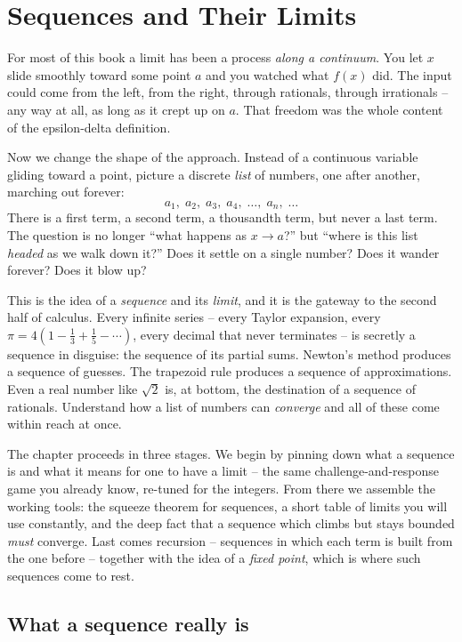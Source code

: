 \chapter{Sequences and Their Limits}

For most of this book a limit has been a process \emph{along a continuum}. You
let $x$ slide smoothly toward some point $a$ and you watched what $f(x)$ did. The
input could come from the left, from the right, through rationals, through
irrationals -- any way at all, as long as it crept up on $a$. That freedom was
the whole content of the epsilon-delta definition.

Now we change the shape of the approach. Instead of a continuous variable
gliding toward a point, picture a discrete \emph{list} of numbers, one after
another, marching out forever:
\[
  a_1,\; a_2,\; a_3,\; a_4,\; \dots,\; a_n,\; \dots
\]
There is a first term, a second term, a thousandth term, but never a last term.
The question is no longer ``what happens as $x \to a$?'' but ``where is this list
\emph{headed} as we walk down it?'' Does it settle on a single number? Does it
wander forever? Does it blow up?

This is the idea of a \emph{sequence} and its \emph{limit}, and it is the gateway
to the second half of calculus. Every infinite series -- every Taylor expansion,
every $\pi = 4(1 - \tfrac13 + \tfrac15 - \cdots)$, every decimal that never
terminates -- is secretly a sequence in disguise: the sequence of its partial
sums. Newton's method produces a sequence of guesses. The trapezoid rule
produces a sequence of approximations. Even a real number like $\sqrt{2}$ is, at
bottom, the destination of a sequence of rationals. Understand how a list
of numbers can \emph{converge} and all of these come within reach at once.

The chapter proceeds in three stages. We begin by pinning down what a sequence is
and what it means for one to have a limit -- the same challenge-and-response game
you already know, re-tuned for the integers. From there we assemble the working
tools: the squeeze theorem for sequences, a short table of limits you will use
constantly, and the deep fact that a sequence which climbs but stays bounded
\emph{must} converge. Last comes recursion -- sequences in which each term is
built from the one before -- together with the idea of a \emph{fixed
point}, which is where such sequences come to rest.

\chapterline

\section{What a sequence really is}
\label{ch28:what-is-a-sequence}

